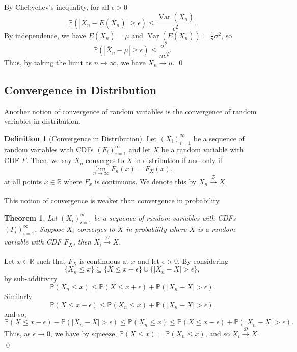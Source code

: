 \documentclass[
]{article}
\newtheorem{theorem}{Theorem}
\theoremstyle{definition}
\newtheorem{definition}{Definition}[section]
\begin{document}
By Chebychev's inequality, for all \(\epsilon > 0\)
\[\mathbb{P}(\left|\bar{X}_n - E(\bar{X}_n) \right| \ge \epsilon) \le 
  \frac{\mathop{\mathrm{Var}}(\bar{X}_n)}{\epsilon^2}.\] By
independence, we have \(E(\bar{X}_n) = \mu\) and
\(\mathop{\mathrm{Var}}(E(\bar{X}_n)) = \frac{1}{n}\sigma ^2\), so
\[\mathbb{P}(\left|\bar{X}_n - \mu \right| \ge \epsilon) \le 
  \frac{\sigma^2}{n\epsilon^2}.\] Thus, by taking the limit as
\(n \to \infty\), we have \(\bar{X}_n \to \mu\). \qed

\hypertarget{convergence-in-distribution}{%
\subsection{Convergence in
Distribution}\label{convergence-in-distribution}}

Another notion of convergence of random variables is the convergence of
random variables in distribution.

\begin{definition}[Convergence in Distribution]
  Let \((X_i)_{i = 1}^\infty\) be a sequence of random variables with CDFs 
  \((F_i)_{i = 1}^\infty\) and let \(X\) be a random variable with CDF \(F\). 
  Then, we say \(X_n\) converges to \(X\) in distribution if and only if 
  \[\lim_{n \to \infty}F_n(x) = F_X(x),\]
  at all points \(x \in \mathbb{R}\) where \(F_x\) is continuous. We denote this 
  by \(X_n \xrightarrow[]{\mathcal{D}} X\).
\end{definition}

This notion of convergence is weaker than convergence in probability.

\begin{theorem}
  Let \((X_i)_{i = 1}^\infty\) be a sequence of random variables with CDFs 
  \((F_i)_{i = 1}^\infty\). Suppose \(X_i\) converges to \(X\) in 
  probability where \(X\) is a random variable with CDF \(F_X\), then 
  \(X_i \xrightarrow[]{\mathcal{D}} X\).
\end{theorem}
\proof

Let \(x \in \mathbb{R}\) such that \(F_X\) is continuous at \(x\) and
let \(\epsilon > 0\). By considering
\[\{X_n \le x\} \subseteq \{X \le x + \epsilon\} 
    \cup \{\left| X_n - X \right| > \epsilon\},\] by sub-additivity
\[\mathbb{P}(X_n \le x) \le \mathbb{P}(X \le x + \epsilon) + 
    \mathbb{P}(\left| X_n - X \right| > \epsilon).\] Similarly
\[\mathbb{P}(X \le x - \epsilon) \le \mathbb{P}(X_n \le x) + 
    \mathbb{P}(\left| X_n - X \right| > \epsilon).\] and so,
\[\mathbb{P}(X \le x - \epsilon) - \mathbb{P}(\left| X_n - X \right| > \epsilon)
    \le \mathbb{P}(X_n \le x) \le 
    \mathbb{P}(X \le x - \epsilon) + \mathbb{P}(\left| X_n - X \right| > \epsilon).\]
Thus, as \(\epsilon \to 0\), we have by squeeze,
\(\mathbb{P}(X \le x) = \mathbb{P}(X_n \le x)\), and so
\(X_i \xrightarrow[]{\mathcal{D}} X\). \qed
\end{document}
